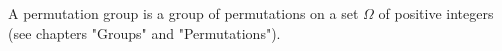 
A permutation  group  is  a group of permutations  on a set  $\Omega$  of
positive integers (see chapters "Groups" and "Permutations").

